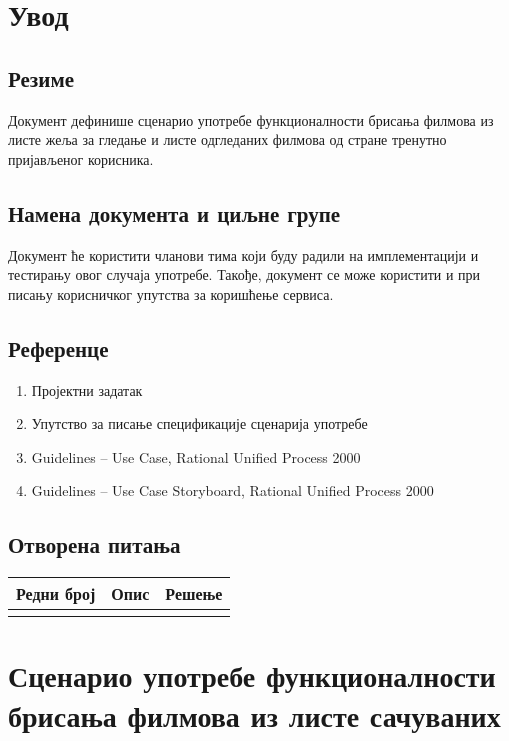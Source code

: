 \section{Увод}

\subsection{Резиме}

Документ дефинише сценарио употребе функционалности брисања филмова из листе жеља за гледање и листе 
одгледаних филмова од стране тренутно пријављеног корисника.

\subsection{Намена документа и циљне групе}

Документ ће користити чланови тима који буду радили на имплементацији и тестирању овог случаја
употребе. Такође, документ се може користити и при писању корисничког упутства за коришћење
сервиса.

\subsection{Референце}

\begin{enumerate}
    \item Пројектни задатак
    \item Упутство за писање спецификације сценарија употребе
    \item Guidelines – Use Case, Rational Unified Process 2000
    \item Guidelines – Use Case Storyboard, Rational Unified Process 2000
\end{enumerate}

\subsection{Отворена питања}

\noindent
\setcellgapes{4pt}
\makegapedcells
\begin{tabularx}{\linewidth}{|l|X|X|}
    \hline
    \textbf{Редни број} & \textbf{Опис} & \textbf{Решење} \\
    \hline
    & & \\
    \hline
\end{tabularx}

\section{Сценарио употребе функционалности брисања филмова из листе сачуваних}

